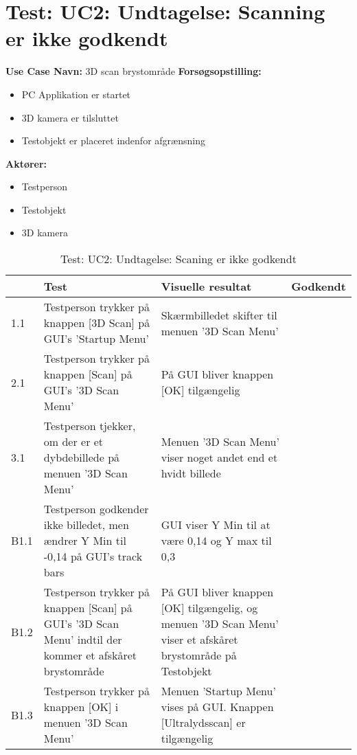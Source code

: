\section{Test: UC2: Undtagelse: Scanning er ikke godkendt}
\textbf{Use Case Navn:} 3D scan brystområde \newline
\textbf{Forsøgsopstilling:}
\begin{itemize}
\item PC Applikation er startet
\item 3D kamera er tilsluttet
\item Testobjekt er placeret indenfor afgrænsning 
\end{itemize}  
\textbf{Aktører:}
\begin{itemize}
\item Testperson
\item Testobjekt
\item 3D kamera
\end{itemize}  

\begin{table}[htb]
\begin{tabularx}{\textwidth}{|p{0.7cm}|X|X|p{2cm}|}
\hline
\textbf{} & \textbf{Test} & \textbf{Visuelle resultat} &\textbf{Godkendt} \\\hline
1.1 & Testperson trykker på knappen [3D Scan] på GUI's 'Startup Menu' & Skærmbilledet skifter til menuen '3D Scan Menu' &  \\\hline
2.1 & Testperson trykker på knappen [Scan] på GUI's '3D Scan Menu' & På GUI bliver knappen [OK] tilgængelig &  \\\hline
3.1 & Testperson tjekker, om der er et dybdebillede på menuen '3D Scan Menu' & Menuen '3D Scan Menu' viser noget andet end et hvidt billede & \\\hline
B1.1 & Testperson godkender ikke billedet, men ændrer Y Min til -0,14 på GUI's track bars & GUI viser Y Min til at være 0,14 og Y max til 0,3  & \\\hline
B1.2 &  Testperson trykker på knappen [Scan] på GUI's '3D Scan Menu' indtil der kommer et afskåret brystområde & På GUI bliver knappen [OK] tilgængelig, og menuen '3D Scan Menu' viser et afskåret brystområde på Testobjekt & \\\hline 
B1.3 & Testperson trykker på knappen [OK] i menuen '3D Scan Menu' & Menuen 'Startup Menu' vises på GUI. Knappen [Ultralydsscan] er tilgængelig & \\\hline
\end{tabularx}
    \caption{Test: UC2: Undtagelse: Scaning er ikke godkendt}
    \label{uc2_test_e_2_label}  
\end{table}
\newpage


